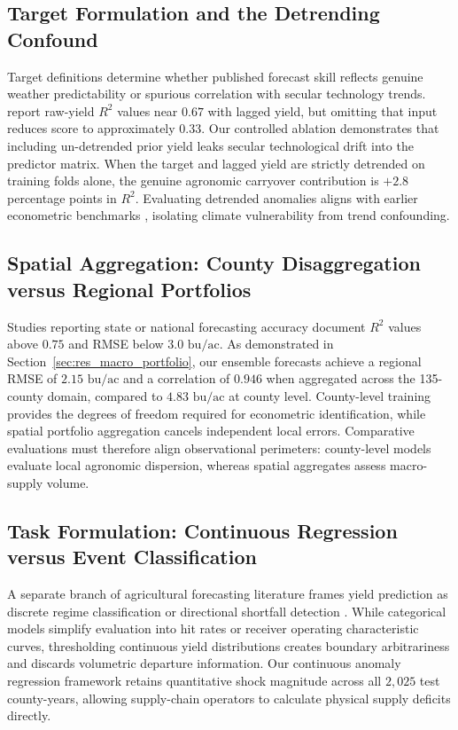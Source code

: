 \subsection{Target Formulation and the Detrending Confound}
Target definitions determine whether published forecast skill reflects genuine weather predictability or spurious correlation with secular technology trends. \citet{ChenZhang2026} report raw-yield $R^2$ values near $0.67$ with lagged yield, but omitting that input reduces score to approximately $0.33$. Our controlled ablation demonstrates that including un-detrended prior yield leaks secular technological drift into the predictor matrix. When the target and lagged yield are strictly detrended on training folds alone, the genuine agronomic carryover contribution is $+2.8$ percentage points in $R^2$. Evaluating detrended anomalies aligns with earlier econometric benchmarks \citep{Hoffman2020}, isolating climate vulnerability from trend confounding.

\subsection{Spatial Aggregation: County Disaggregation versus Regional Portfolios}
Studies reporting state or national forecasting accuracy document $R^2$ values above $0.75$ and RMSE below $3.0\text{ bu/ac}$. As demonstrated in Section~\ref{sec:res_macro_portfolio}, our ensemble forecasts achieve a regional RMSE of $2.15\text{ bu/ac}$ and a correlation of $0.946$ when aggregated across the 135-county domain, compared to $4.83\text{ bu/ac}$ at county level. County-level training provides the degrees of freedom required for econometric identification, while spatial portfolio aggregation cancels independent local errors. Comparative evaluations must therefore align observational perimeters: county-level models evaluate local agronomic dispersion, whereas spatial aggregates assess macro-supply volume.

\subsection{Task Formulation: Continuous Regression versus Event Classification}
A separate branch of agricultural forecasting literature frames yield prediction as discrete regime classification or directional shortfall detection \citep{Iizumietal2021, Vijverberg2023}. While categorical models simplify evaluation into hit rates or receiver operating characteristic curves, thresholding continuous yield distributions creates boundary arbitrariness and discards volumetric departure information. Our continuous anomaly regression framework retains quantitative shock magnitude across all $2{,}025$ test county-years, allowing supply-chain operators to calculate physical supply deficits directly.

